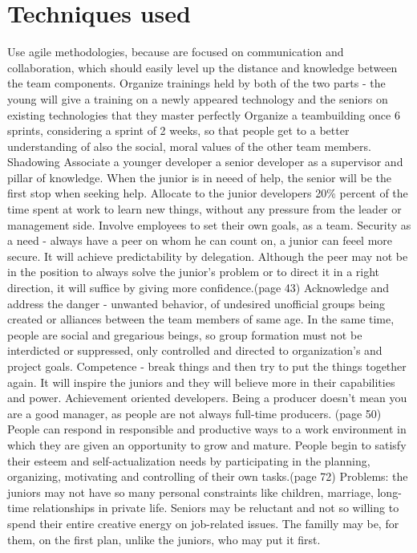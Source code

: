 \documentclass[conference]{IEEEtran}
\begin{document}
\section{Techniques used}
Use agile methodologies, because are focused on communication and collaboration, which should easily level up the distance and knowledge between the team components.
\newline\indent
Organize trainings held by both of the two parts - the young will give a training on a newly appeared technology and the seniors on existing technologies that they master perfectly
\newline\indent
Organize a teambuilding once 6 sprints, considering a sprint of 2 weeks, so that people get to a better understanding of also the social, moral values of the other team members.
\newline\indent
Shadowing
\newline\indent
Associate a younger developer a senior developer as a supervisor and pillar of knowledge. When the junior is in neeed of help, the senior will be the first stop when seeking help.
\newline\indent
Allocate to the junior developers 20\% percent of the time spent at work to learn new things, without any pressure from the leader or management side.
\newline\indent
Involve employees to set their own goals, as a team.
\newline\indent
Security as a need - always have a peer on whom he can count on, a junior can feeel more secure. It will achieve predictability by delegation. Although the peer may not be in the position to always solve the junior's problem or to direct it in a right direction, it will suffice by giving more confidence.(page 43)
\newline\indent
Acknowledge and address the danger - unwanted behavior, of undesired unofficial groups being created or alliances between the team members of same age. In the same time, people are social and gregarious beings, so group formation must not be interdicted or suppressed, only controlled and directed to organization's and project goals.
\newline\indent
Competence - break things and then try to put the things together again. It will inspire the juniors and they will believe more in their capabilities and power. Achievement oriented developers. Being a producer doesn't mean you are a good manager, as people are not always full-time producers. (page 50)
\newline\indent
People can respond in responsible and productive ways to a work environment in which they are given an opportunity to grow and mature. People begin to satisfy their esteem and self-actualization needs by participating in the planning, organizing, motivating and controlling of their own tasks.(page 72)
\newline\indent
Problems: the juniors may not have so many personal constraints like children, marriage, long-time relationships in private life. Seniors may be reluctant and not so willing to spend their entire creative energy on job-related issues. The familly may be, for them, on the first plan, unlike the juniors, who may put it first.
\end{document}
